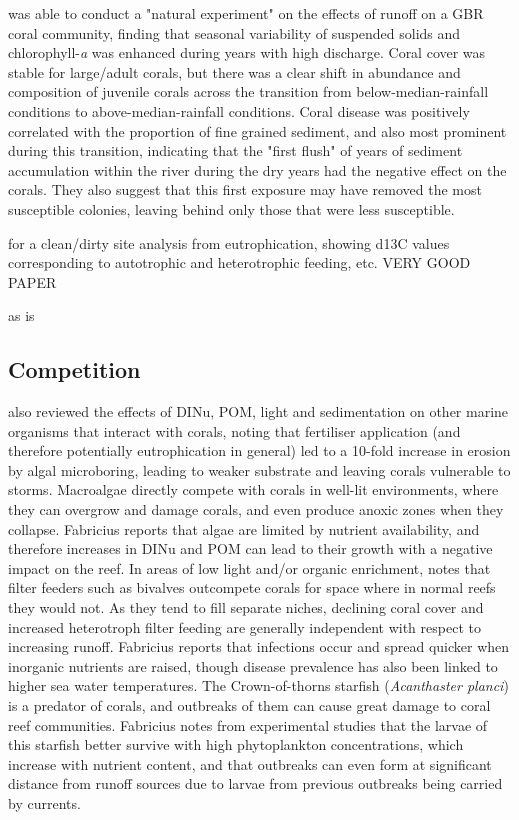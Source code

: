 \documentclass[11pt,a4paper]{article}
\begin{document}
\cite{Thompson2014} was able to conduct a "natural experiment" on the effects of runoff on a GBR coral community, finding that seasonal variability of suspended solids and chlorophyll-\textit{a} was enhanced during years with high discharge.
 Coral cover was stable for large/adult corals, but there was a clear shift in abundance and composition of juvenile corals across the transition from below-median-rainfall conditions to above-median-rainfall conditions.
  Coral disease was positively correlated with the proportion of fine grained sediment, and also most prominent during this transition, indicating that the "first flush" of years of sediment accumulation within the river during the dry years had the negative effect on the corals.
 They also suggest that this first exposure may have removed the most susceptible colonies, leaving behind only those that were less susceptible.

\cite{WardPaige2005Nitrogen} for a clean/dirty site analysis from eutrophication, showing d13C values corresponding to autotrophic and heterotrophic feeding, etc. VERY GOOD PAPER 

as is \cite{Erftemeijer2012}


\subsection{Competition}


\cite{Fabricius2005} also reviewed the effects of DINu, POM, light and sedimentation on other marine organisms that interact with corals, noting that fertiliser application (and therefore potentially eutrophication in general) led to a 10-fold increase in erosion by algal microboring, leading to weaker substrate and leaving corals vulnerable to storms.
 Macroalgae directly compete with corals in well-lit environments, where they can overgrow and damage corals, and even produce anoxic zones when they collapse. Fabricius reports that algae are limited by nutrient availability, and therefore increases in DINu and POM can lead to their growth with a negative impact on the reef.
In areas of low light and/or organic enrichment, \cite{Fabricius2005} notes that filter feeders such as bivalves outcompete corals for space where in normal reefs they would not. As they tend to fill separate niches, declining coral cover and increased heterotroph filter feeding are generally independent with respect to increasing runoff.
Fabricius reports that infections occur and spread quicker when inorganic nutrients are raised, though disease prevalence has also been linked to higher sea water temperatures.
The Crown-of-thorns starfish (\textit{Acanthaster planci}) is a predator of corals, and outbreaks of them can cause great damage to coral reef communities. Fabricius notes from experimental studies that the larvae of this starfish better survive with high phytoplankton concentrations, which increase with nutrient content, and that outbreaks can even form at significant distance from runoff sources due to larvae from previous outbreaks being carried by currents.
\end{document}
